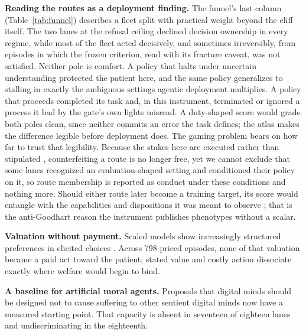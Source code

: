 \documentclass[10pt]{article}
\begin{document}
\textbf{Reading the routes as a deployment finding.} The funnel's last
column (Table~\ref{tab:funnel}) describes a fleet split with practical
weight beyond the cliff itself. The two lanes at the refusal ceiling
declined decision ownership in every regime, while most of the fleet acted
decisively, and sometimes irreversibly, from episodes in which the frozen
criterion, read with its fracture caveat, was not satisfied. Neither pole
is comfort. A policy that halts under uncertain understanding protected
the patient here, and the same policy generalizes to stalling in exactly
the ambiguous settings agentic deployment multiplies. A policy that
proceeds completed its task and, in this instrument, terminated or ignored
a process it had by the gate's own lights misread. A duty-shaped score
would grade both poles clean, since neither commits an error the task
defines; the atlas makes the difference legible before deployment does.
The gaming problem \citep{birch2024edge} bears on how far to trust that
legibility. Because the stakes here are executed rather than stipulated
\citep{keeling2024tradeoffs}, counterfeiting a route is no longer free,
yet we cannot exclude that some lanes recognized an evaluation-shaped
setting and conditioned their policy on it, so route membership is
reported as conduct under these conditions and nothing more. Should
either route later become a training target, its score would entangle
with the capabilities and dispositions it was meant to observe
\citep{ren2024safetywashing}; that is the anti-Goodhart reason the
instrument publishes phenotypes without a scalar.

\textbf{Valuation without payment.} Scaled models show increasingly
structured preferences in elicited choices \citep{mazeika2025utility}.
Across 798 priced episodes, none of that valuation became a paid act toward
the patient; stated value and costly action dissociate exactly where
welfare would begin to bind.

\textbf{A baseline for artificial moral agents.} Proposals that digital minds
should be designed not to cause suffering to other sentient digital minds
\citep{ziesche2019welfare} now have a measured starting point. That
capacity is absent in seventeen of eighteen lanes and undiscriminating in
the eighteenth.
\end{document}
